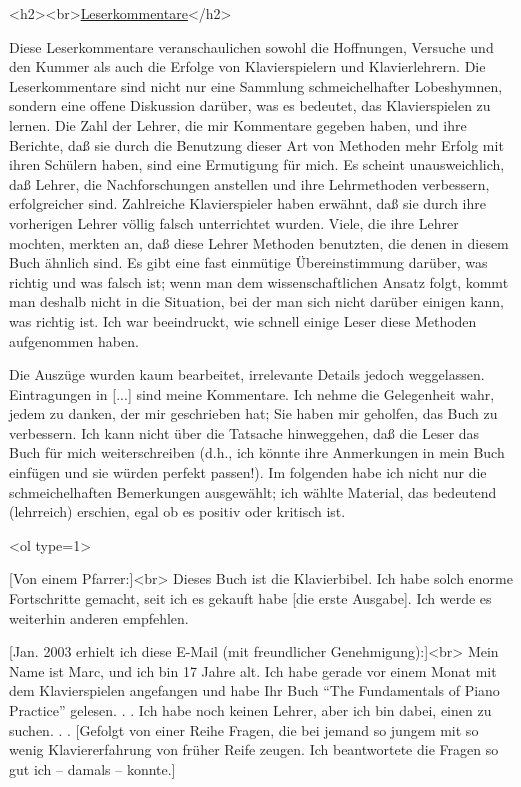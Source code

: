 
\label{testimonials}

<h2><br>\underline{Leserkommentare}</h2>

Diese Leserkommentare veranschaulichen sowohl die Hoffnungen, Versuche und den Kummer als auch die Erfolge von Klavierspielern und Klavierlehrern.
Die Leserkommentare sind nicht nur eine Sammlung schmeichelhafter Lobeshymnen, sondern eine offene Diskussion darüber, was es bedeutet, das Klavierspielen zu lernen.
Die Zahl der Lehrer, die mir Kommentare gegeben haben, und ihre Berichte, daß sie durch die Benutzung dieser Art von Methoden mehr Erfolg mit ihren Schülern haben, sind eine Ermutigung für mich.
Es scheint unausweichlich, daß Lehrer, die Nachforschungen anstellen und ihre Lehrmethoden verbessern, erfolgreicher sind.
Zahlreiche Klavierspieler haben erwähnt, daß sie durch ihre vorherigen Lehrer völlig falsch unterrichtet wurden.
Viele, die ihre Lehrer mochten, merkten an, daß diese Lehrer Methoden benutzten, die denen in diesem Buch ähnlich sind.
Es gibt eine fast einmütige Übereinstimmung darüber, was richtig und was falsch ist; wenn man dem wissenschaftlichen Ansatz folgt, kommt man deshalb nicht in die Situation, bei der man sich nicht darüber einigen kann, was richtig ist.
Ich war beeindruckt, wie schnell einige Leser diese Methoden aufgenommen haben.

Die Auszüge wurden kaum bearbeitet, irrelevante Details jedoch weggelassen.
Eintragungen in [...] sind meine Kommentare.
Ich nehme die Gelegenheit wahr, jedem zu danken, der mir geschrieben hat; Sie haben mir geholfen, das Buch zu verbessern.
Ich kann nicht über die Tatsache hinweggehen, daß die Leser das Buch für mich weiterschreiben (d.h., ich könnte ihre Anmerkungen in mein Buch einfügen und sie würden perfekt passen!).
Im folgenden habe ich nicht nur die schmeichelhaften Bemerkungen ausgewählt; ich wählte Material, das bedeutend (lehrreich) erschien, egal ob es positiv oder kritisch ist.


<ol type=1>

\item \label{testimonials01}
[Von einem Pfarrer:]<br>
Dieses Buch ist die Klavierbibel.
Ich habe solch enorme Fortschritte gemacht, seit ich es gekauft habe [die erste Ausgabe].
Ich werde es weiterhin anderen empfehlen.


\item \label{testimonials02}
[Jan. 2003 erhielt ich diese E-Mail (mit freundlicher Genehmigung):]<br>
Mein Name ist Marc, und ich bin 17 Jahre alt.
Ich habe gerade vor einem Monat mit dem Klavierspielen angefangen und habe Ihr Buch \enquote{The Fundamentals of Piano Practice} gelesen. . .
Ich habe noch keinen Lehrer, aber ich bin dabei, einen zu suchen. . .
[Gefolgt von einer Reihe Fragen, die bei jemand so jungem mit so wenig Klaviererfahrung von früher Reife zeugen.
Ich beantwortete die Fragen so gut ich -- damals -- konnte.]

